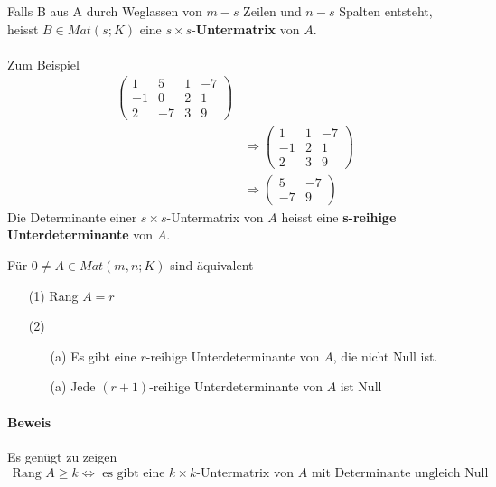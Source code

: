 \documentclass[11pt]{report}
\newcommand*\f[1] {\textbf{#1}}
\begin{document}
Falls B aus A durch Weglassen von $m-s$ Zeilen und $n-s$ Spalten entsteht, heisst $B \in Mat(s;K)$ eine $s \times s$-\f{Untermatrix} von $A$. \\\\
Zum Beispiel
\begin{align}
\begin{pmatrix} 1 & 5 & 1 & -7 \\ -1 & 0 & 2 & 1 \\ 2 & -7 & 3 & 9 \end{pmatrix}& \\
&\Rightarrow \begin{pmatrix} 1 & 1 & -7 \\ -1 & 2 & 1 \\ 2 & 3 & 9\end{pmatrix} \\
&\Rightarrow \begin{pmatrix} 5 & -7 \\ -7 & 9 \end{pmatrix}
\end{align}
Die Determinante einer $s \times s$-Untermatrix von $A$ heisst eine \f{s-reihige Unterdeterminante} von $A$.

\begin{satz}
\label{satz632}
Für $0 \neq A \in Mat(m,n; K)$ sind äquivalent
\begin{itemize}
 \item[(1)] Rang $A = r$
 \item[(2)] 
\begin{itemize}
\item[(a)] Es gibt eine $r$-reihige Unterdeterminante von $A$, die nicht Null ist.
\item[(a)] Jede $(r+1)$-reihige Unterdeterminante von $A$ ist Null
\end{itemize}
\end{itemize}
\end{satz}

\paragraph{Beweis}
Es genügt zu zeigen
\begin{align}
\text{Rang } A \geq k \Leftrightarrow \text{ es gibt eine $k \times k$-Untermatrix von $A$ mit Determinante ungleich Null}
\end{align}
\end{document}
